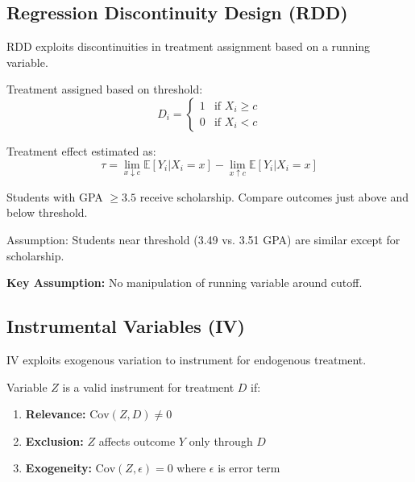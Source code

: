 \subsection{Regression Discontinuity Design (RDD)}

RDD exploits discontinuities in treatment assignment based on a running variable.

\begin{definition}
Treatment assigned based on threshold:
\begin{equation}
D_i = \begin{cases}
1 & \text{if } X_i \geq c \\
0 & \text{if } X_i < c
\end{cases}
\end{equation}

Treatment effect estimated as:
\begin{equation}
\tau = \lim_{x \downarrow c} \mathbb{E}[Y_i | X_i = x] - \lim_{x \uparrow c} \mathbb{E}[Y_i | X_i = x]
\end{equation}
\end{definition}

\begin{example}
Students with GPA $\geq 3.5$ receive scholarship. Compare outcomes just above and below threshold.

Assumption: Students near threshold (3.49 vs. 3.51 GPA) are similar except for scholarship.
\end{example}

\textbf{Key Assumption:} No manipulation of running variable around cutoff.

\subsection{Instrumental Variables (IV)}

IV exploits exogenous variation to instrument for endogenous treatment.

\begin{definition}
Variable $Z$ is a valid instrument for treatment $D$ if:
\begin{enumerate}
    \item \textbf{Relevance:} $\text{Cov}(Z, D) \neq 0$
    \item \textbf{Exclusion:} $Z$ affects outcome $Y$ only through $D$
    \item \textbf{Exogeneity:} $\text{Cov}(Z, \epsilon) = 0$ where $\epsilon$ is error term
\end{enumerate}
\end{definition}

